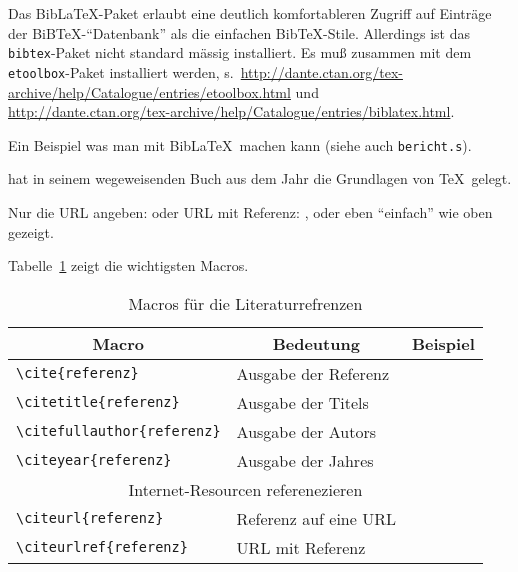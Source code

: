 Das Bib\LaTeX-Paket erlaubt eine deutlich komfortableren Zugriff auf Einträge der
BiB\TeX-"`Datenbank"' als die einfachen Bib\TeX-Stile. Allerdings ist das \texttt{bibtex}-Paket
nicht standard mässig installiert. Es muß zusammen mit dem \texttt{etoolbox}-Paket installiert
werden, s.\
\url{http://dante.ctan.org/tex-archive/help/Catalogue/entries/etoolbox.html} und\\
\url{http://dante.ctan.org/tex-archive/help/Catalogue/entries/biblatex.html}.


Ein Beispiel was man mit Bib\LaTeX\ machen kann (siehe auch \texttt{bericht.s}).

 hat in seinem wegeweisenden Buch
 aus dem Jahr \citeyear{knuth.1984a}
die Grundlagen von \TeX\ gelegt.

Nur die URL angeben:  oder URL mit Referenz:
\citeurlref{dante.2010a}, oder eben "`einfach"' wie oben gezeigt.

Tabelle~\ref{bibtex-macros} zeigt die wichtigsten Macros.
\begin{table}
\begin{center}
\small
\begin{tabular}{|l|l|l|}\hline
\multicolumn{1}{|c}{Macro}        & \multicolumn{1}{|c}{Bedeutung} &    \multicolumn{1}{|c|}{Beispiel} \\\hline\hline
\verb+\cite{referenz}+            & Ausgabe der Referenz           & \cite{knuth.1984a}             \\
\verb+\citetitle{referenz}+       & Ausgabe der Titels             & \citetitle{knuth.1984a}        \\
\verb+\citefullauthor{referenz}+  & Ausgabe der Autors             & \citefullauthor{knuth.1984a}   \\
\verb+\citeyear{referenz}+        & Ausgabe der Jahres             & \citeyear{knuth.1984a}         \\\hline
\multicolumn{3}{|c|}{Internet-Resourcen referenezieren}                                             \\\hline
\verb+\citeurl{referenz}+         & Referenz auf eine URL          & \citeurl{dante.2010a}          \\
\verb+\citeurlref{referenz}+      & URL  mit Referenz              & \citeurlref{dante.2010a}       \\\hline
\end{tabular}
\end{center}
\caption{\label{bibtex-macros}Macros für die Literaturrefrenzen}
\end{table}

